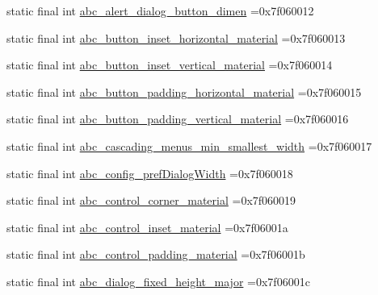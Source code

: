 \begin{DoxyCompactItemize}
static final int \mbox{\hyperlink{classcom_1_1example_1_1trainawearapplication_1_1_r_1_1dimen_a2a5f3cb980df2bb4d2ae8ce794852438}{abc\+\_\+alert\+\_\+dialog\+\_\+button\+\_\+dimen}} =0x7f060012
\item 
static final int \mbox{\hyperlink{classcom_1_1example_1_1trainawearapplication_1_1_r_1_1dimen_a52f9b53d73121fc824f755a7955e2500}{abc\+\_\+button\+\_\+inset\+\_\+horizontal\+\_\+material}} =0x7f060013
\item 
static final int \mbox{\hyperlink{classcom_1_1example_1_1trainawearapplication_1_1_r_1_1dimen_af50eb034ee049fe89cb84645c1ea8bfb}{abc\+\_\+button\+\_\+inset\+\_\+vertical\+\_\+material}} =0x7f060014
\item 
static final int \mbox{\hyperlink{classcom_1_1example_1_1trainawearapplication_1_1_r_1_1dimen_a5f5dae5b1224bcf882c02e581f2350cd}{abc\+\_\+button\+\_\+padding\+\_\+horizontal\+\_\+material}} =0x7f060015
\item 
static final int \mbox{\hyperlink{classcom_1_1example_1_1trainawearapplication_1_1_r_1_1dimen_a36f8a27897442c26518c4eeba32ce62a}{abc\+\_\+button\+\_\+padding\+\_\+vertical\+\_\+material}} =0x7f060016
\item 
static final int \mbox{\hyperlink{classcom_1_1example_1_1trainawearapplication_1_1_r_1_1dimen_a376ff8301d32e8ae9ada3798e2463434}{abc\+\_\+cascading\+\_\+menus\+\_\+min\+\_\+smallest\+\_\+width}} =0x7f060017
\item 
static final int \mbox{\hyperlink{classcom_1_1example_1_1trainawearapplication_1_1_r_1_1dimen_a1e006affafff4ee493afc177b9d52bd4}{abc\+\_\+config\+\_\+pref\+Dialog\+Width}} =0x7f060018
\item 
static final int \mbox{\hyperlink{classcom_1_1example_1_1trainawearapplication_1_1_r_1_1dimen_af0c6390b437460f05aedbcfa88ca2e86}{abc\+\_\+control\+\_\+corner\+\_\+material}} =0x7f060019
\item 
static final int \mbox{\hyperlink{classcom_1_1example_1_1trainawearapplication_1_1_r_1_1dimen_a6468e2bc8c65926ad86de603b73d8146}{abc\+\_\+control\+\_\+inset\+\_\+material}} =0x7f06001a
\item 
static final int \mbox{\hyperlink{classcom_1_1example_1_1trainawearapplication_1_1_r_1_1dimen_a9f42b7d2e2f6237d67c3ed758f67235e}{abc\+\_\+control\+\_\+padding\+\_\+material}} =0x7f06001b
\item 
static final int \mbox{\hyperlink{classcom_1_1example_1_1trainawearapplication_1_1_r_1_1dimen_ada9e479f809559376f5ba8fb34799382}{abc\+\_\+dialog\+\_\+fixed\+\_\+height\+\_\+major}} =0x7f06001c

\end{DoxyCompactItemize}
